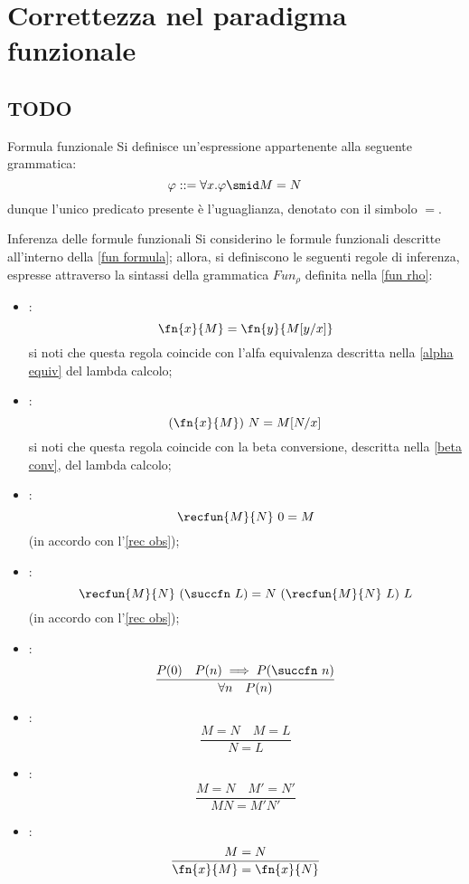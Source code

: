 \documentclass[a4paper, 12pt]{report}
\begin{document}
    \section{Correttezza nel paradigma funzionale}

    \subsection{TODO}

    \begin{frameddefn}[label={fun formula}]{Formula funzionale}
        Si definisce  un'espressione appartenente alla seguente grammatica: $$\varphi ::= \forall x.\varphi \smid M = N$$ dunque l'unico predicato presente è l'uguaglianza, denotato con il simbolo $=$.
    \end{frameddefn}

    \begin{framedprop}[breakable]{Inferenza delle formule funzionali}
        Si considerino le formule funzionali descritte all'interno della \cref{fun formula}; allora, si definiscono le seguenti regole di inferenza, espresse attraverso la sintassi della grammatica $Fun_\rho$ definita nella \cref{fun rho}:

        \begin{itemize}
            \item {}: $$\fn{x}{M} = \fn{y}{M[y/x]}$$ si noti che questa regola coincide con l'alfa equivalenza descritta nella \cref{alpha equiv} del lambda calcolo;
            \item {}: $$(\fn{x}{M})\ N = M[N/x]$$ si noti che questa regola coincide con la beta conversione, descritta nella \cref{beta conv}, del lambda calcolo;
            \item {}: $$\recfun{M}{N} \ 0 = M$$ (in accordo con l'\cref{rec obs});
            \item {}: $$\recfun{M}{N} \ (\succfn \ L) = N \ (\recfun{M}{N} \ L) \ L$$ (in accordo con l'\cref{rec obs});
            \item {}: $$\dfrac{P(0) \quad P(n) \implies P(\succfn \ n)}{\forall n \quad P(n)}$$
            \item {}: $$\dfrac{M = N \quad M = L}{N = L}$$
            \item {}: $$\dfrac{M = N \quad M' = N'}{MN = M'N'}$$
            \item {}: $$\dfrac{M= N}{\fn{x}{M} = \fn{x}{N}}$$
        \end{itemize}
    \end{framedprop}
\end{document}
